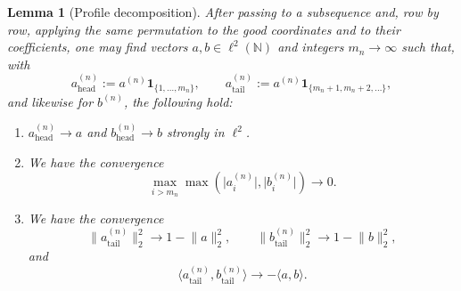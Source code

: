 \documentclass[11pt]{amsart}
\numberwithin{equation}{section}
\newtheorem{lemma}[theorem]{Lemma}
\theoremstyle{definition}
\theoremstyle{remark}
\newcommand{\N}{\mathbb N}
\newcommand{\abs}[1]{\lvert #1 \rvert}
\newcommand{\norm}[1]{\lVert #1 \rVert}
\newcommand{\ip}[2]{\langle #1,#2\rangle}
\begin{document}
\begin{lemma}[Profile decomposition]\label{lem:profile}
After passing to a subsequence and, row by row, applying the same permutation
to the good coordinates and to their coefficients, one may find vectors
$a,b\in\ell^2(\N)$ and integers $m_n\to\infty$ such that, with
\[
a_{\mathrm{head}}^{(n)}:=a^{(n)}\mathbf 1_{\{1,\dots,m_n\}},
\qquad
a_{\mathrm{tail}}^{(n)}:=a^{(n)}\mathbf 1_{\{m_n+1,m_n+2,\dots\}},
\]
and likewise for $b^{(n)}$, the following hold:
\begin{enumerate}[label=\rm(\arabic*)]
\item $a_{\mathrm{head}}^{(n)}\to a$ and $b_{\mathrm{head}}^{(n)}\to b$
strongly in $\ell^2$.
\item We have the convergence
\[
\max_{i>m_n}\max(\abs{a_i^{(n)}},\abs{b_i^{(n)}})\to0.
\]
\item We have the convergence
\[
\norm{a_{\mathrm{tail}}^{(n)}}_2^2\to1-\norm{a}_2^2,
\qquad
\norm{b_{\mathrm{tail}}^{(n)}}_2^2\to1-\norm{b}_2^2,
\]
and
\[
\ip{a_{\mathrm{tail}}^{(n)}}{b_{\mathrm{tail}}^{(n)}}
\to -\ip{a}{b}.
\]
\end{enumerate}
\end{lemma}
\end{document}
